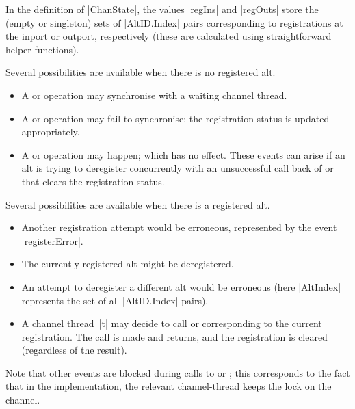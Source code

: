 In the definition of |ChanState|, the values |regIns| and |regOuts| store the
(empty or singleton) sets of |AltID.Index| pairs corresponding to
registrations at the inport or outport, respectively (these are calculated
using straightforward helper functions).

Several possibilities are available when there is no registered alt.
%
\begin{itemize}
\item A  or  operation may synchronise
  with a waiting channel thread.

\item A  or  operation may fail to
  synchronise; the registration status is updated appropriately.

\item A  or  operation may happen;
  which has no effect.  These events can arise if an alt is trying to
  deregister concurrently with an unsuccessful call back of
   or  that clears the registration
  status. 
\end{itemize}

Several possibilities are available when there is a registered alt.
%
\begin{itemize}
\item Another registration attempt would be erroneous, represented by the
  event |registerError|.

\item The currently registered alt might be deregistered.

\item An attempt to deregister a different alt would be erroneous (here
  |AltIndex| represents the set of all |AltID.Index| pairs).

\item A channel thread~|t| may decide to call  or
   corresponding to the current registration.  The call is
  made and returns, and the registration is cleared (regardless of the
  result). 
\end{itemize}
%
Note that other events are blocked during calls to  or
; this corresponds to the fact that in the implementation,
the relevant channel-thread keeps the lock on the channel.

